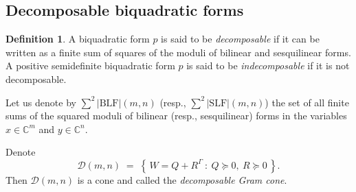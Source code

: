 \documentclass[12pt,a4paper]{amsart}
\theoremstyle{plain}
\theoremstyle{remark}
\theoremstyle{definition}
\newtheorem{defn}[theorem]{Definition}
\def \C {\mathbb{C}}
\begin{document}
\subsection{Decomposable biquadratic forms}
\begin{defn}
A biquadratic form $p$ is said to be \textit{decomposable} if it can be written as a finite sum of squares of the moduli of bilinear and sesquilinear forms. A positive semidefinite biquadratic form $p$ is said to be \textit{indecomposable} if it is not decomposable. 

  Let us denote by ${\sum}^2|\mathrm{BLF}| (m,n)$ (resp., ${\sum}^2|\mathrm{SLF}|(m,n)$) the set of all finite sums of the squared moduli of bilinear (resp., sesquilinear) forms in the variables $x\in \C^m$ and $y\in \C^n.$  
  
\end{defn}
Denote
\[
	\mathcal D (m,n) \;=\;\left\{\,W = Q + R^{\Gamma}\ :\ Q\succeq 0,\ R\succeq 0\,\right\}.
\]
Then $\mathcal D (m,n)$ is a cone and called the \emph{decomposable Gram cone}.
\end{document}
